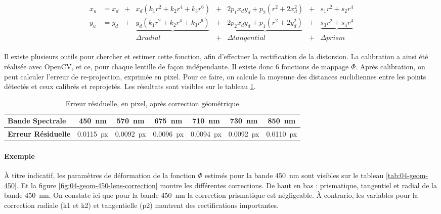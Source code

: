 \documentclass[../thesis.tex]{subfiles}
\begin{document}
    \begin{eqnarray}
    \begin{array}{rlcccccc}
    x_u &= x_d &+& {x_d(k_1 r^2 + k_2 r^4 + k_3 r^6)}
    &+& {2 p_1 x_d y_d + p_2(r^2 + 2 x_d^2)}
    &+& {s_1 r^2 + s_2 r^4} \\
    
    y_u &= y_d &+& {\underbrace{y_d(k_1 r^2 + k_2 r^4 + k_3 r^6)}}
    &+& {\underbrace{2 p_2 x_d y_d + p_1(r^2 + 2 y_d^2)}}
    &+& {\underbrace{s_3 r^2 + s_4 r^4}} \\
    
    &      & & {\Delta {radial}}
    &+& {\Delta {tangential}}
    &+& {\Delta {prism}}
    \end{array}
    \end{eqnarray}
    
    \par Il existe plusieurs outils pour chercher et estimer cette fonction, afin d'effectuer la rectification de la distorsion. La calibration a ainsi été réalisée avec OpenCV, et ce, pour chaque lentille de façon indépendante. Il existe donc 6 fonctions de mappage $\Phi$. Après calibration, on peut calculer l'erreur de re-projection, exprimée en pixel. Pour ce faire, on calcule la moyenne des distances euclidiennes entre les points détectés et ceux calibrés et reprojetés. Les résultats sont visibles sur le tableau \ref{tab:04-geom-error}.
    
    \begin{table}[H]
        \centering
        \begin{tabular}{|l|c|c|c|c|c|c|}
            \hline
            \textbf{Bande Spectrale} & \SI{450}{nm} & \SI{570}{nm} & \SI{675}{nm} & \SI{710}{nm} & \SI{730}{nm} & \SI{850}{nm} \\ \hline
            \textbf{Erreur Résiduelle} & \SI{0.0115}{px} & \SI{0.0092}{px} & \SI{0.0096}{px} & \SI{0.0094}{px} & \SI{0.0092}{px} & \SI{0.0110}{px} \\
            \hline
        \end{tabular}
        \caption{Erreur résiduelle, en pixel, après correction géométrique}
        \label{tab:04-geom-error}
    \end{table}
    
    \newpage
    \paragraph{Exemple} À titre indicatif, les paramètres de déformation de la fonction $\Phi$ estimés pour la bande \SI{450}{nm} sont visibles sur le tableau \ref{tab:04-geom-450}. Et la figure \ref{fig:04-geom-450-lens-correction} montre les différentes corrections. De haut en bas : prismatique, tangentiel et radial de la bande \SI{450}{nm}. On constate ici que pour la bande \SI{450}{nm} la correction prismatique est négligeable. À contrario, les variables pour la correction radiale (k1 et k2) et tangentielle (p2) montrent des rectifications importantes.
    
\end{document}
